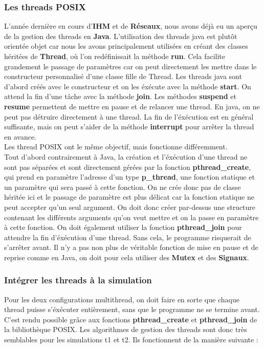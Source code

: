 \documentclass[11pt]{article} %
\begin{document}
\subsubsection{Les threads POSIX}

L'année dernière en cours d'\textbf{IHM} et de \textbf{Réseaux}, nous avons déjà eu un aperçu de la gestion des threads en \textbf{Java}. L'utilisation des threads java est plutôt orientée objet car nous les avons principalement utilisées en créant des classes héritées de \textbf{Thread}, où l'on redéfinissait la méthode \textbf{run}. Cela facilite grandement le passage de paramètres car on peut directement les mettre dans le constructeur personnalisé d'une classe fille de Thread.
Les threads java sont d'abord créés avec le constructeur et on les éxécute avec la méthode \textbf{start}. On attend la fin d'une tâche avec la méthode \textbf{join}. Les méthodes \textbf{suspend} et \textbf{resume} permettent de mettre en pause et de relancer une thread. En java, on ne peut pas détruire directement à une thread. La fin de l'éxécution est en général suffisante, mais on peut s'aider de la méthode \textbf{interrupt} pour arrêter la thread en avance. \\

Les thread POSIX ont le même objectif, mais fonctionne différemment. \\
Tout d'abord contrairement à Java, la création et l'éxécution d'une thread ne sont pas séparées et sont directement gérées par la fonction \textbf{pthread\_create}, qui prend en paramètre l'adresse d'un type \textbf{p\_thread}, une  fonction statique et un paramètre qui sera passé à cette fonction.  On ne crée donc pas de classe héritée ici et le passage de paramètre est plus délicat car la fonction statique ne peut accepter qu'un seul argument. On doit donc créer par-dessus une structure contenant les différents arguments qu'on veut mettre et on la passe en paramètre à cette fonction. On doit également utiliser la fonction \textbf{pthread\_join} pour attendre la fin d'éxécution d'une thread. Sans cela, le programme risquerait de s'arrêter avant. Il n'y a pas non plus de véritable fonction de mise en pause et de reprise comme en Java, on doit pour cela utiliser des \textbf{Mutex} et des \textbf{Signaux}.

\subsubsection{Intégrer les threads à la simulation}
Pour les deux configurations multithread, on doit faire en sorte que chaque thread puisse s'éxécuter entièrement, sans que le programme ne se termine avant. C'est rendu possible grâce aux fonctions \textbf{pthread\_create} et \textbf{pthread\_join} de la bibliothèque POSIX. Les algorithmes de gestion des threads sont donc très semblables pour les simulations t1 et t2. Ils fonctionnent de la manière suivante : 
\end{document}
